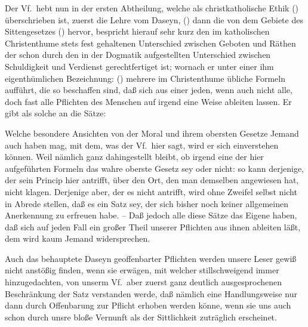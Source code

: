 Der Vf.\ hebt nun in der ersten Abtheilung, welche als christkatholische Ethik () überschrieben ist, zuerst die Lehre vom Daseyn, () dann die von dem Gebiete des Sittengesetzes () hervor, bespricht hierauf sehr kurz den im katholischen Christenthume stets fest gehaltenen Unterschied zwischen Geboten und  Räthen der schon durch den in der Dogmatik aufgestellten Unterschied zwischen Schuldigkeit und Verdienst gerechtfertiget ist; wornach er unter einer ihm eigenthümlichen Bezeichnung:  () mehrere im Christenthume übliche Formeln aufführt, die so beschaffen sind, daß sich aus einer jeden, wenn auch nicht alle, doch fast alle Pflichten des Menschen auf irgend eine Weise ableiten lassen. Er gibt als solche an die Sätze: \par
{} \par
Welche besondere Ansichten von der Moral und ihrem obersten Gesetze Jemand auch haben mag, mit dem, was der Vf.\ hier sagt, wird er sich einverstehen können. Weil nämlich ganz dahingestellt bleibt, ob irgend eine der hier aufgeführten Formeln das wahre oberste Gesetz sey oder nicht: so kann derjenige, der sein Princip hier antrifft, über den Ort, den man demselben angewiesen hat, nicht klagen. Derjenige aber, der es nicht antrifft, wird ohne Zweifel selbst nicht in Abrede stellen, daß es ein Satz sey, der sich bisher noch keiner allgemeinen Anerkennung zu erfreuen habe. -- Daß jedoch alle diese Sätze das Eigene haben, daß sich auf jeden Fall ein großer Theil unserer Pflichten aus ihnen ableiten läßt, dem wird kaum Jemand widersprechen. \par
Auch das  behauptete Daseyn geoffenbarter Pflichten werden unsere Leser gewiß nicht anstößig finden, wenn sie erwägen, mit welcher stillschweigend immer hinzugedachten, von unserm Vf.\ aber zuerst ganz deutlich ausgesprochenen Beschränkung der Satz verstanden werde,  daß nämlich eine Handlungsweise nur dann durch Offenbarung zur Pflicht erhoben werden könne, wenn sie uns auch schon durch unsre bloße Vernunft als der Sittlichkeit zuträglich erscheinet. \par

